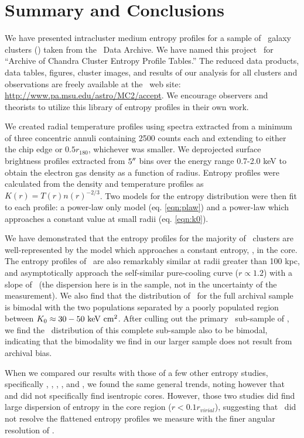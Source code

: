 \documentclass[12pt,preprint]{aastex}
\begin{document}
\section{Summary and Conclusions}
\label{sec:summary}

We have presented intracluster medium entropy profiles for a sample of
\numcluster\ galaxy clusters (\expt) taken from the \chandra\ Data
Archive. We have named this project \accept\ for ``Archive of Chandra
Cluster Entropy Profile Tables.'' The reduced data products, data
tables, figures, cluster images, and results of our analysis for all
clusters and observations are freely available at the \accept\ web
site: \url{http://www.pa.msu.edu/astro/MC2/accept}. We encourage
observers and theorists to utilize this library of entropy profiles in
their own work.

We created radial temperature profiles using spectra extracted from a
minimum of three concentric annuli containing 2500 counts each and
extending to either the chip edge or $0.5 r_{180}$, whichever was
smaller. We deprojected surface brightness profiles extracted from
$5\mathrm{^\prime}\hskip -0.1em\mathrm{^\prime}$ bins over the energy range 0.7-2.0 keV to obtain the electron
gas density as a function of radius. Entropy profiles were calculated
from the density and temperature profiles as $K(r) =
T(r)n(r)^{-2/3}$. Two models for the entropy distribution were then
fit to each profile: a power-law only model (eq. \ref{eqn:plaw}) and
a power-law which approaches a constant value at small radii
(eq. \ref{eqn:k0}).

We have demonstrated that the entropy profiles for the majority of
\accept\ clusters are well-represented by the model which approaches a
constant entropy, \kna, in the core. The entropy profiles of
\accept\ are also remarkably similar at radii greater than 100 kpc,
and asymptotically approach the self-similar pure-cooling curve ($r
\propto 1.2$) with a slope of \alphafs\ (the dispersion here is in the
sample, not in the uncertainty of the measurement). We also find that
the distribution of \kna\ for the full archival sample is bimodal with
the two populations separated by a poorly populated region between
$K_0 \approx 30-50 \mathrm{\mbox{\ensuremath{\mathrm{~keV}}} \mathrm{\mbox{\ensuremath{\mathrm{~cm}}}^2}}$. After culling out the primary
\hifl\ sub-sample of \citet{hiflugcs1}, we find the \kna\ distribution
of this complete sub-sample also to be bimodal, indicating that the
bimodality we find in our larger sample does not result from archival
bias.

When we compared our results with those of a few other entropy
studies, specifically \citet{davies00}, \citet{ponman03},
\citet{piffaretti05}, \citet{pratt06}, and \citet{morandi07}, we found
the same general trends, noting however that \citet{piffaretti05} and
\citet{pratt06} did not specifically find isentropic cores. However,
those two studies did find large dispersion of entropy in the core
region ($r < 0.1 r_{virial}$), suggesting that \xmm\ did not resolve
the flattened entropy profiles we measure with the finer angular
resolution of \chandra.
\end{document}
